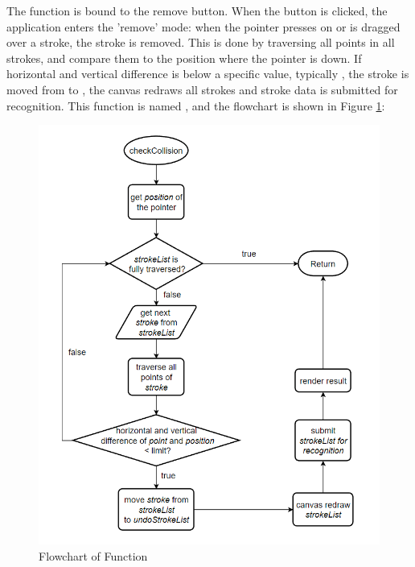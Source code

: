 \documentclass[12pt,twoside]{report}
\begin{document}
The  function is bound to the remove button. When the button is
clicked, the application enters the 'remove' mode: when the pointer presses on
or is dragged over a stroke, the stroke is removed. This is done by traversing
all points in all strokes, and compare them to the position where the pointer is
down. If horizontal and vertical difference is below a specific value, typically
, the stroke is moved from  to ,  the canvas
redraws all strokes and stroke data is submitted for recognition. This function
is named , and the flowchart is shown in Figure \ref{fig:flowchart-remove}:
\begin{figure}[H]
    \centering
    \includegraphics[width=0.8\linewidth, frame]{figures/flowchart-remove.png}
    \caption{Flowchart of Function }
    \label{fig:flowchart-remove}
\end{figure}
\end{document}
